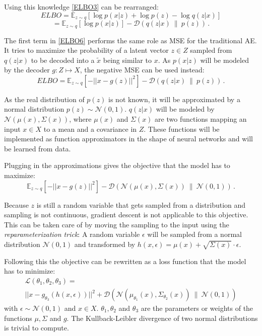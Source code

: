 \documentclass[a4paper]{IEEEtran}
\begin{document}
Using this knowledge \eqref{ELBO3} can be rearranged:
\begin{equation}
	ELBO = \mathbb{E}_{z \sim q}\left[ \log p(x|z) + \log p(z) - \log q(z|x) \right]
	\label{ELBO5}
\end{equation}
\begin{equation}
	= \mathbb{E}_{z \sim q}\left[ \log p(x|z) \right] - \mathcal{D}(q(z|x) \ \| \ p(z))\,.
	\label{ELBO6}
\end{equation}

The first term in \eqref{ELBO6} performs the same role as MSE for the traditional AE. It tries to maximize the probability of a latent vector $z \in Z$ sampled from $q(z|x)$ to be decoded into a $\tilde{x}$ being similar to $x$. As $p(x|z)$ will be modeled by the decoder $g : Z \mapsto X$, the negative MSE can be used instead:
\begin{equation}
	ELBO = \mathbb{E}_{z \sim q}\left[ -||x - g(z)||^2 \right] - \mathcal{D}(q(z|x) \ \| \ p(z))\,.
	\label{ELBO7}
\end{equation}

As the real distribution of $p(z)$ is not known, it will be approximated by a normal distribution $p(z) \sim \mathcal{N}(0,1)$. $q(z|x)$ will be modeled by $\mathcal{N}(\mu(x), \Sigma(x))$, where $\mu(x)$ and $\Sigma(x)$ are two functions mapping an input $x \in X$ to a mean and a covariance in $Z$. These functions will be implemented as function approximators in the shape of neural networks and will be learned from data.

Plugging in the approximations gives the objective that the model has to maximize:
\begin{equation}
	\mathbb{E}_{z \sim q}\left[ -||x - g(z)||^2 \right] - \mathcal{D}(\mathcal{N}(\mu(x), \Sigma(x)) \ \| \ \mathcal{N}(0, 1))\,.
\end{equation}

Because $z$ is still a random variable that gets sampled from a distribution and sampling is not continuous, gradient descent is not applicable to this objective. This can be taken care of by moving the sampling to the input using the \textit{reparameterization trick}: A random variable $\epsilon$ will be sampled from a normal distribution $\mathcal{N}(0,1)$ and transformed by $h(x, \epsilon) = \mu(x) + \sqrt{\Sigma(x)} \cdot \epsilon$. 

Following this the objective can be rewritten as a loss function that the model has to minimize:
\begin{gather}
	\mathcal{L}(\theta_1, \theta_2, \theta_3) = \\ 
	||x - g_{\theta_3}(h(x, \epsilon))||^2 + \mathcal{D}(\mathcal{N}(\mu_{\theta_1}(x), \Sigma_{\theta_2}(x)) \ \| \ \mathcal{N}(0, 1))
	\label{vae_loss}
\end{gather}
with $\epsilon \sim \mathcal{N}(0,1)$ and $x \in X$. $\theta_1, \theta_2$ and $\theta_3$ are the parameters or weights of the functions $\mu, \Sigma$ and $g$. The Kullback-Leibler divergence of two normal distributions is trivial to compute.
\end{document}
